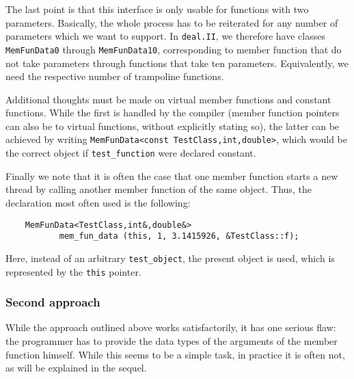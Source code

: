 \documentclass[11pt]{article}
\begin{document}
The last point is that this interface is only usable for functions with two
parameters. Basically, the whole process has to be reiterated for any number
of parameters which we want to support. In \texttt{deal.II}, we therefore have
classes \texttt{MemFunData0} through \texttt{MemFunData10}, corresponding to
member function that do not take parameters through functions that take ten
parameters. Equivalently, we need the respective number of trampoline
functions. 

Additional thoughts must be made on virtual member functions and constant
functions. While the first is handled by the compiler (member function
pointers can also be to virtual functions, without explicitly stating so), the
latter can be achieved by writing 
\texttt{MemFunData<const TestClass,int,double>}, which would be the correct
object if \texttt{test\_function} were declared constant.

Finally we note that it is often the case that one member function starts a
new thread by calling another member function of the same object. Thus, the
declaration most often used is the following:
\begin{verbatim}
    MemFunData<TestClass,int&,double&>  
           mem_fun_data (this, 1, 3.1415926, &TestClass::f);
\end{verbatim}
Here, instead of an arbitrary \texttt{test\_object}, the present object is
used, which is represented by the \texttt{this} pointer.



\subsubsection{Second approach}

While the approach outlined above works satisfactorily, it has one serious
flaw: the programmer has to provide the data types of the arguments of the
member function himself. While this seems to be a simple task, in practice it
is often not, as will be explained in the sequel.
\end{document}
